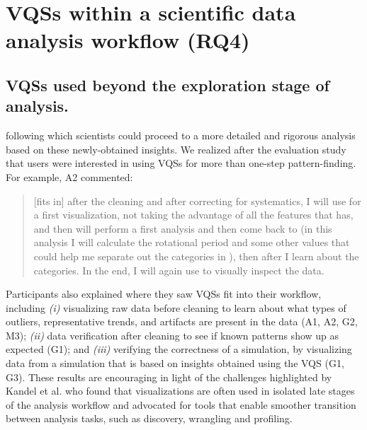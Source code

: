 \section{VQSs within a scientific data analysis workflow (RQ4)}
\subsection{VQSs used beyond the exploration stage of analysis.} 
\par {}  following which scientists could proceed to a more detailed and rigorous analysis based on these newly-obtained insights. We realized after the evaluation study that users were interested in using VQSs for more than one-step pattern-finding. For example, A2 commented:
\begin{quote}
[\zv fits in] after the cleaning and after correcting for systematics, I will use \zv for a first visualization, not taking the advantage of all the features that \zv has, and then will perform a first analysis and then come back to \zv (in this analysis I will calculate the rotational period and some other values that could help me separate out the categories in \zv), then after I learn about the categories. In the end, I will again use \zv to visually inspect the data. %
\end{quote}
Participants also explained where they saw VQSs fit into their workflow, including {\em (i)} visualizing raw data before cleaning to learn about what types of outliers, representative trends, and artifacts are present in the data (A1, A2, G2, M3); {\em (ii)}
 data verification after cleaning to see if known patterns show up as expected (G1);
 and {\em (iii)}
verifying the correctness of a simulation, by visualizing data from a simulation that is based on insights obtained using the VQS (G1, G3). These results are encouraging in light of the challenges highlighted by Kandel et al. who found that visualizations are often used in isolated late stages of the analysis workflow and advocated for tools that enable smoother transition between analysis tasks, such as discovery, wrangling and profiling\cite{Kandel2012}.
